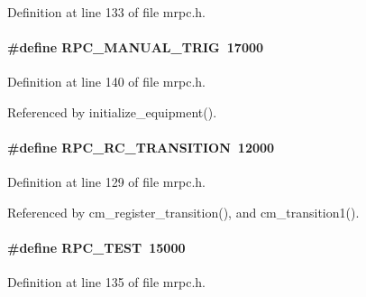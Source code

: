 \begin{DoxyItemize}
\item 
\end{DoxyItemize}

Definition at line 133 of file mrpc.h.
\paragraph[{RPC\_\-MANUAL\_\-TRIG}]{\setlength{\rightskip}{0pt plus 5cm}\#define RPC\_\-MANUAL\_\-TRIG~17000}\hfill\label{group__mrpcdefineh_gaf820c7d84c71a1469983d23ebec18a8f}

\begin{DoxyItemize}
\item 
\end{DoxyItemize}

Definition at line 140 of file mrpc.h.

Referenced by initialize\_\-equipment().
\paragraph[{RPC\_\-RC\_\-TRANSITION}]{\setlength{\rightskip}{0pt plus 5cm}\#define RPC\_\-RC\_\-TRANSITION~12000}\hfill\label{group__mrpcdefineh_ga48951274da337133b5244b6e2814e5b8}

\begin{DoxyItemize}
\item 
\end{DoxyItemize}

Definition at line 129 of file mrpc.h.

Referenced by cm\_\-register\_\-transition(), and cm\_\-transition1().
\paragraph[{RPC\_\-TEST}]{\setlength{\rightskip}{0pt plus 5cm}\#define RPC\_\-TEST~15000}\hfill\label{group__mrpcdefineh_gafa20e13515da863309de89b69c843ad3}

\begin{DoxyItemize}
\item 
\end{DoxyItemize}

Definition at line 135 of file mrpc.h.